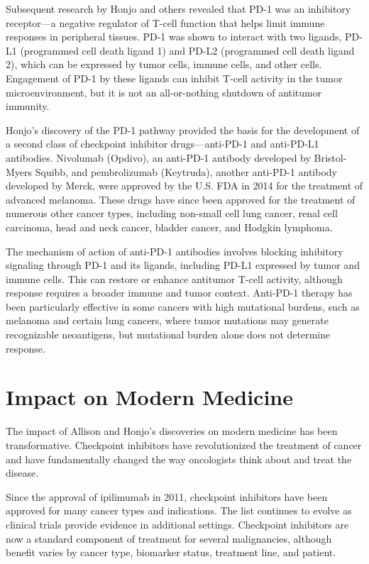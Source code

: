Subsequent research by Honjo and others revealed that PD-1 was an inhibitory receptor---a negative regulator of T-cell function that helps limit immune responses in peripheral tissues. PD-1 was shown to interact with two ligands, PD-L1 (programmed cell death ligand 1) and PD-L2 (programmed cell death ligand 2), which can be expressed by tumor cells, immune cells, and other cells. Engagement of PD-1 by these ligands can inhibit T-cell activity in the tumor microenvironment, but it is not an all-or-nothing shutdown of antitumor immunity.

Honjo's discovery of the PD-1 pathway provided the basis for the development of a second class of checkpoint inhibitor drugs---anti-PD-1 and anti-PD-L1 antibodies. Nivolumab (Opdivo), an anti-PD-1 antibody developed by Bristol-Myers Squibb, and pembrolizumab (Keytruda), another anti-PD-1 antibody developed by Merck, were approved by the U.S. FDA in 2014 for the treatment of advanced melanoma. These drugs have since been approved for the treatment of numerous other cancer types, including non-small cell lung cancer, renal cell carcinoma, head and neck cancer, bladder cancer, and Hodgkin lymphoma.

The mechanism of action of anti-PD-1 antibodies involves blocking inhibitory signaling through PD-1 and its ligands, including PD-L1 expressed by tumor and immune cells. This can restore or enhance antitumor T-cell activity, although response requires a broader immune and tumor context. Anti-PD-1 therapy has been particularly effective in some cancers with high mutational burdens, such as melanoma and certain lung cancers, where tumor mutations may generate recognizable neoantigens, but mutational burden alone does not determine response.

\section{Impact on Modern Medicine}

The impact of Allison and Honjo's discoveries on modern medicine has been transformative. Checkpoint inhibitors have revolutionized the treatment of cancer and have fundamentally changed the way oncologists think about and treat the disease.

Since the approval of ipilimumab in 2011, checkpoint inhibitors have been approved for many cancer types and indications. The list continues to evolve as clinical trials provide evidence in additional settings. Checkpoint inhibitors are now a standard component of treatment for several malignancies, although benefit varies by cancer type, biomarker status, treatment line, and patient.

